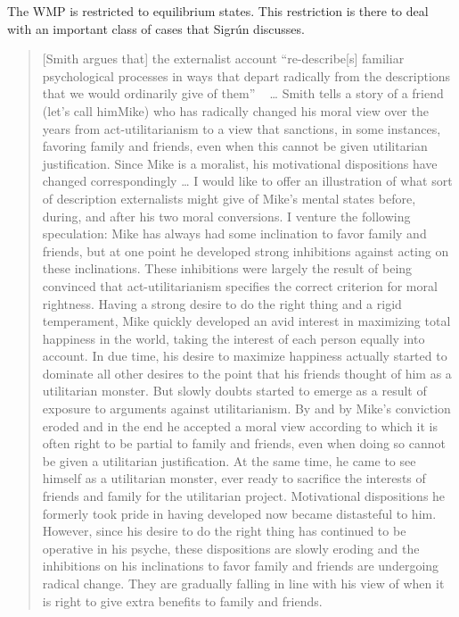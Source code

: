 The WMP is restricted to equilibrium states. This restriction is there to deal with an important class of cases that Sigrún \citet{Svavarsdottir1999} discusses.

\begin{quote}
[Smith argues that] the externalist account ``re-describe[s] familiar psychological processes in ways that depart radically from the descriptions that we would ordinarily give of them'' ~\citep[180]{Smith1996} {\ldots} Smith tells a story of a friend (let's call him\gls{Mike}) who has radically changed his moral view over the years from act-utilitarianism to a view that sanctions, in some instances, favoring family and friends, even when this cannot be given utilitarian justification. Since \gls{Mike} is a moralist, his motivational dispositions have changed correspondingly {\ldots} I would like to offer an illustration of what sort of description externalists might give of \gls{Mike}'s mental states before, during, and after his two moral conversions. I venture the following speculation: \gls{Mike} has always had some inclination to favor family and friends, but at one point he developed strong inhibitions against acting on these inclinations. These inhibitions were largely the result of being convinced that act-utilitarianism specifies the correct criterion for moral rightness. Having a strong desire to do the right thing and a rigid temperament, \gls{Mike} quickly developed an avid interest in maximizing total happiness in the world, taking the interest of each person equally into account. In due time, his desire to maximize happiness actually started to dominate all other desires to the point that his friends thought of him as a utilitarian monster. But slowly doubts started to emerge as a result of exposure to arguments against utilitarianism. By and by \gls{Mike}'s conviction eroded and in the end he accepted a moral view according to which it is often right to be partial to family and friends, even when doing so cannot be given a utilitarian justification. At the same time, he came to see himself as a utilitarian monster, ever ready to sacrifice the interests of friends and family for the utilitarian project. Motivational dispositions he formerly took pride in having developed now became distasteful to him. However, since his desire to do the right thing has continued to be operative in his psyche, these dispositions are slowly eroding and the inhibitions on his inclinations to favor family and friends are undergoing radical change. They are gradually falling in line with his view of when it is right to give extra benefits to family and friends. ~\citep[208-10]{Svavarsdottir1999}
\end{quote}
